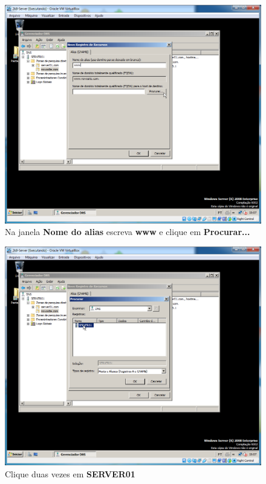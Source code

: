 \documentclass[10pt]{article}
\begin{document}
\begin{figure}[H]
    \centering
    \caption{Na janela \textbf{Nome do alias} escreva \textbf{www} e clique em \textbf{Procurar...}}
    \label{fig:5532015}
    \includegraphics[width=\linewidth]{images/IIS/criando_um_novo_site/015.png}
\end{figure}
\begin{figure}[H]
    \centering
    \caption{Clique duas vezes em \textbf{SERVER01}}
    \label{fig:5532016}
    \includegraphics[width=\linewidth]{images/IIS/criando_um_novo_site/016.png}
\end{figure}
\end{document}
